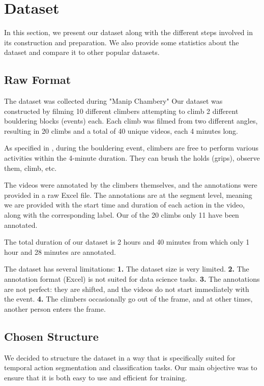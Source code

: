 \section{Dataset}

In this section, we present our dataset along with the different steps involved in its construction and preparation. We also provide some statistics about the dataset and compare it to other popular datasets.

\subsection{Raw Format}

The dataset was collected during "Manip Chambery" Our dataset was constructed by filming 10 different climbers attempting to climb 2 different bouldering blocks (events) each. Each climb was filmed from two different angles, resulting in 20 climbs and a total of 40 unique videos, each 4 minutes long.

As specified in \cite{section:context}, during the bouldering event, climbers are free to perform various activities within the 4-minute duration. They can brush the holds (grips), observe them, climb, etc.

The videos were annotated by the climbers themselves, and the annotations were provided in a raw Excel file. The annotations are at the segment level, meaning we are provided with the start time and duration of each action in the video, along with the corresponding label. Our of the 20 climbs only 11 have been annotated.

The total duration of our dataset is 2 hours and 40 minutes from which only 1 hour and 28 minutes are annotated.

The dataset has several limitations: \textbf{1.} The dataset size is very limited. \textbf{2.} The annotation format (Excel) is not suited for data science tasks. \textbf{3.} The annotations are not perfect: they are shifted, and the videos do not start immediately with the event. \textbf{4.} The climbers occasionally go out of the frame, and at other times, another person enters the frame.

\subsection{Chosen Structure}

We decided to structure the dataset in a way that is specifically suited for temporal action segmentation and classification tasks. Our main objective was to ensure that it is both easy to use and efficient for training.

